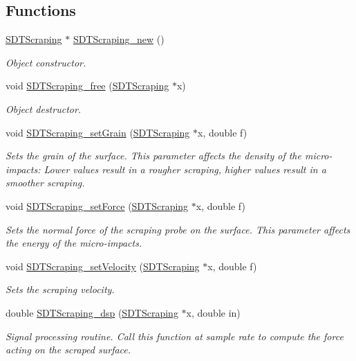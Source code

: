 \subsection*{Functions}
\begin{DoxyCompactItemize}
\item 
\hyperlink{group__scraping_ga31635c2bb9b5bed7af5e675ad89f1bde}{S\+D\+T\+Scraping} $\ast$ \hyperlink{group__scraping_gaeba68cf1ec2ca297e46a4a3cd7da8415}{S\+D\+T\+Scraping\+\_\+new} ()
\begin{DoxyCompactList}\small\item\em Object constructor. \end{DoxyCompactList}\item 
void \hyperlink{group__scraping_gac291caf6b1ab22e723bb75f476f2a66f}{S\+D\+T\+Scraping\+\_\+free} (\hyperlink{group__scraping_ga31635c2bb9b5bed7af5e675ad89f1bde}{S\+D\+T\+Scraping} $\ast$x)
\begin{DoxyCompactList}\small\item\em Object destructor. \end{DoxyCompactList}\item 
void \hyperlink{group__scraping_ga015ecdce2da4cb91bf64c6794918e627}{S\+D\+T\+Scraping\+\_\+set\+Grain} (\hyperlink{group__scraping_ga31635c2bb9b5bed7af5e675ad89f1bde}{S\+D\+T\+Scraping} $\ast$x, double f)
\begin{DoxyCompactList}\small\item\em Sets the grain of the surface. This parameter affects the density of the micro-\/impacts\+: Lower values result in a rougher scraping, higher values result in a smoother scraping. \end{DoxyCompactList}\item 
void \hyperlink{group__scraping_ga00e1a82a147b9c2f6eb5ba7894cb9c83}{S\+D\+T\+Scraping\+\_\+set\+Force} (\hyperlink{group__scraping_ga31635c2bb9b5bed7af5e675ad89f1bde}{S\+D\+T\+Scraping} $\ast$x, double f)
\begin{DoxyCompactList}\small\item\em Sets the normal force of the scraping probe on the surface. This parameter affects the energy of the micro-\/impacts. \end{DoxyCompactList}\item 
void \hyperlink{group__scraping_gabf0eacd5788f48c3d48b416460d18092}{S\+D\+T\+Scraping\+\_\+set\+Velocity} (\hyperlink{group__scraping_ga31635c2bb9b5bed7af5e675ad89f1bde}{S\+D\+T\+Scraping} $\ast$x, double f)
\begin{DoxyCompactList}\small\item\em Sets the scraping velocity. \end{DoxyCompactList}\item 
double \hyperlink{group__scraping_ga22b839ce06e1e62409e51bd284dc60f8}{S\+D\+T\+Scraping\+\_\+dsp} (\hyperlink{group__scraping_ga31635c2bb9b5bed7af5e675ad89f1bde}{S\+D\+T\+Scraping} $\ast$x, double in)
\begin{DoxyCompactList}\small\item\em Signal processing routine. Call this function at sample rate to compute the force acting on the scraped surface. \end{DoxyCompactList}\end{DoxyCompactItemize}


